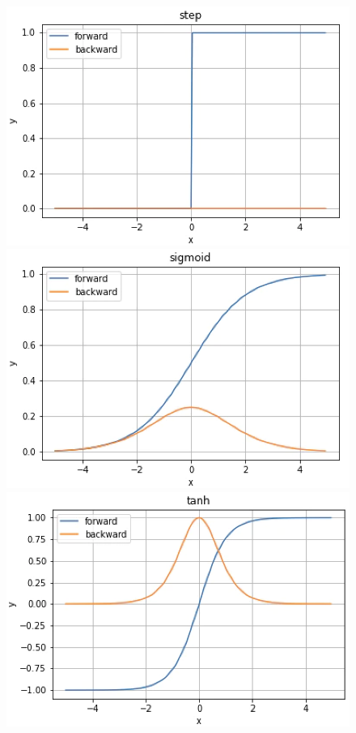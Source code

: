 \begin{figure}[H]
  \begin{minipage}[b]{0.45\linewidth}
   \centering
    \includegraphics[keepaspectratio, scale=0.25]{Figure/Deeplearning/step.png}
  \end{minipage}
    \begin{minipage}[b]{0.45\linewidth}
    \centering
    \includegraphics[keepaspectratio, scale=0.25]{Figure/Deeplearning/sigmoid.png}
  \end{minipage}
  \begin{minipage}[b]{0.45\linewidth}
  \centering
    \includegraphics[keepaspectratio, scale=0.25]{Figure/Deeplearning/tanh.png}

\end{minipage}
\end{figure}
